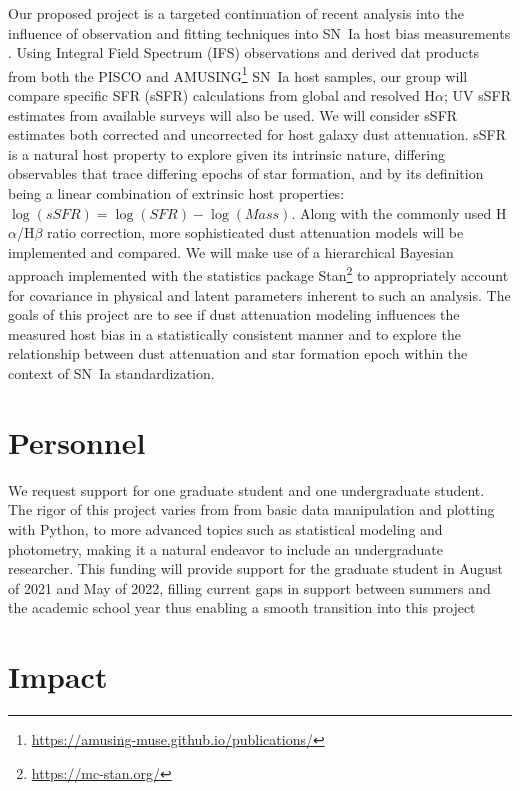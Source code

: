 \documentclass[modern]{aastex63}
\begin{document}
Our proposed project is a targeted continuation of recent analysis into the influence of observation and fitting techniques into SN~Ia host bias measurements \citep{Hand2021}.
Using Integral Field Spectrum (IFS) observations and derived dat products from both the PISCO \citep{Galbany2018} and AMUSING\footnote{\url{https://amusing-muse.github.io/publications/}} SN~Ia host samples, our group will compare specific SFR (sSFR) calculations from global and resolved H$\alpha$; UV sSFR estimates from available surveys will also be used.
We will consider sSFR estimates both corrected and uncorrected for host galaxy dust attenuation.
sSFR is a natural host property to explore given its intrinsic nature, differing observables that trace differing epochs of star formation, and by its definition being a linear combination of extrinsic host properties: $\log(sSFR) = \log(SFR) - \log(Mass)$.
Along with the commonly used H$\alpha$/H$\beta$ ratio correction, more sophisticated dust attenuation models will be implemented and compared\citep{Salim2018,Narayanan2018}.  
We will make use of a hierarchical Bayesian approach implemented with the statistics package Stan\footnote{\url{https://mc-stan.org/}} to appropriately account for covariance in physical and latent parameters inherent to such an analysis.
The goals of this project are to see if dust attenuation modeling influences the measured host bias in a statistically consistent manner and to explore the relationship between dust attenuation and star formation epoch within the context of SN~Ia standardization.
\section{Personnel}
We request support for one graduate student and one undergraduate student.
The rigor of this project varies from from basic data manipulation and plotting with Python, to more advanced topics such as statistical modeling and photometry, making it a natural endeavor to include an undergraduate researcher.
This funding will provide support for the graduate student in August of 2021 and May of 2022, filling current gaps in support between summers and the academic school year thus enabling a smooth transition into this project

\section{Impact}




\end{document}
